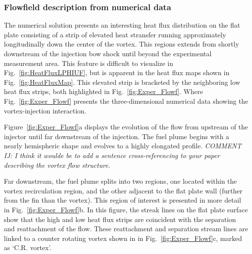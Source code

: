 \documentclass{AIAA}
\begin{document}
\subsubsection{Flowfield description from numerical data}

The numerical solution presents an interesting heat flux distribution on the flat plate consisting of a strip of elevated heat stransfer running approximately longitudinally down the center of the vortex.
This regions extends from shortly downstream of the injection bow shock until beyond the experimental measurement area.
This feature is difficult to visualize in Fig.~\ref{fig:HeatFluxLPHIUF}, but is apparent in the heat flux maps shown in Fig.~\ref{fig:HeatFluxMap}.
This elevated strip is bracketed by the neighboring low heat flux strips, both highlighted in Fig.~\ref{fig:Exper_Flowf}.
Where Fig.~\ref{fig:Exper_Flowf} presents the three-dimensional numerical data showing the vortex-injection interaction. 


Figure~\ref{fig:Exper_Flowf}a displays the evolution of the flow from upstream of the injector until far downstream of  the injection.
The fuel plume begins with a nearly hemispheric shape and evolves to a highly elongated profile.
{\it COMMENT IJ: I think it woulde be to add a sentence cross-referencing to your paper describing the vortex flow structure.}
 
Far downstream, the fuel plume splits into two regions, one located within the vortex recirculation region, and the other adjacent to the flat plate wall (further from the fin than the vortex).
This region of interest is presented in more detail in Fig.~\ref{fig:Exper_Flowf}b.
In this figure, the streak lines on the flat plate surface show that the high and low heat flux strips are coincident with the separation and reattachment of the flow.
These reattachment and separation stream lines are linked to a counter rotating vortex shown in in Fig.~\ref{fig:Exper_Flowf}c, marked as `C.R. vortex'.
\end{document}
